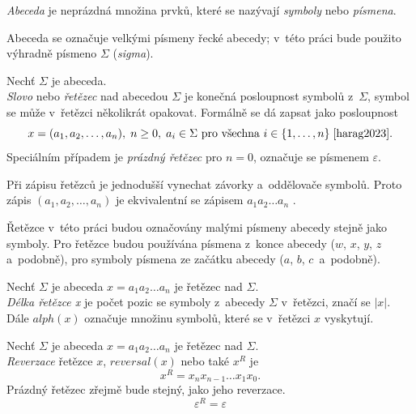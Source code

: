 \begin{definition}
    \emph{Abeceda} je neprázdná množina prvků, které se nazývají \emph{symboly} nebo \emph{písmena}.
\end{definition}

\begin{convention}
    Abeceda se označuje velkými písmeny řecké abecedy; v~této práci bude použito výhradně písmeno $\Sigma$ (\emph{sigma}).
\end{convention}

\begin{definition}
    Nechť $\Sigma$ je abeceda. \\
    \emph{Slovo} nebo \emph{řetězec} nad abecedou $\Sigma$ je konečná posloupnost symbolů z~$\Sigma$, symbol se může v~řetězci několikrát opakovat.
    Formálně se dá zapsat jako posloupnost
    \begin{equation*}
        x = (a_1, a_2, \ldots, a_n),\; n \geq 0,\; a_i \in \Sigma \text{ pro všechna } i \in \{1, \ldots ,n\}\; \cite{harag2023}.
    \end{equation*}
    Speciálním případem je \emph{prázdný řetězec} pro $n = 0$, označuje se písmenem $\varepsilon$.
\end{definition}

\begin{convention}
    Při zápisu řetězců je jednodušší vynechat závorky a~oddělovače symbolů.
    Proto zápis $(a_1, a_2, \ldots, a_n)$ je ekvivalentní se zápisem $a_1a_2\ldots a_n$ \cite{meduna2014formal}.
    
    Řetězce v~této práci budou označovány malými písmeny abecedy stejně jako symboly.
    Pro řetězce budou používána písmena z~konce abecedy ($w$, $x$, $y$, $z\,$ a~podobně), pro symboly písmena ze začátku abecedy ($a$, $b$, $c\,$ a~podobně).
\end{convention}

\begin{definition}
    Nechť $\Sigma$ je abeceda $x = a_1a_2\ldots a_n$ je řetězec nad $\Sigma$.\\
    \emph{Délka řetězce x} je počet pozic se symboly z~abecedy $\Sigma$ v~řetězci, značí se $|x|$.
    Dále $alph(x)$ označuje množinu symbolů, které se v~řetězci $x$ vyskytují.
\end{definition}

\begin{definition}
    Nechť $\Sigma$ je abeceda $x = a_1a_2\ldots a_n$ je řetězec nad $\Sigma$.\\
    \emph{Reverzace} řetězce $x$, $reversal(x)$ nebo také $x^R$ je
    \begin{equation*}
        x^R = x_nx_{n-1}\ldots x_1x_0.
    \end{equation*} 
    Prázdný řetězec zřejmě bude stejný, jako jeho reverzace.
    \begin{equation*}
        \varepsilon^R = \varepsilon
    \end{equation*}
\end{definition}

